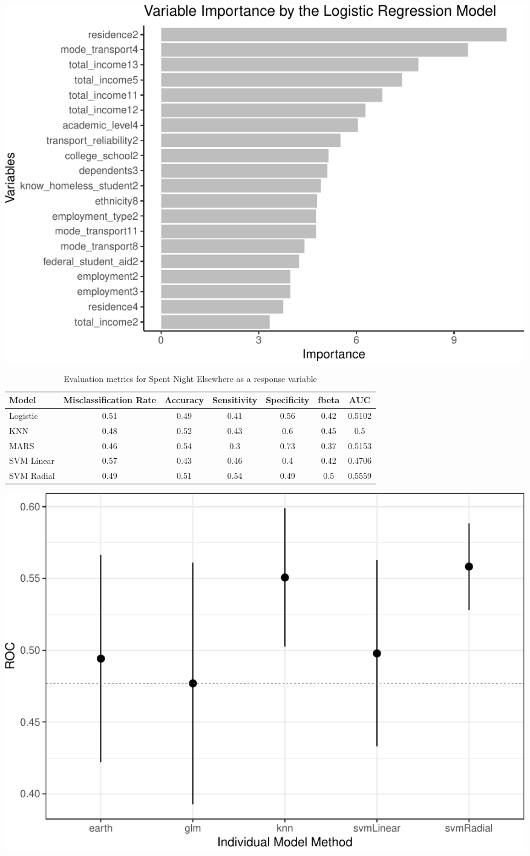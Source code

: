 \documentclass[
  10pt,
]{article}
\begin{document}
\includegraphics{phase2_report_files/figure-latex/unnamed-chunk-10-1}

\begin{table}[H]

\caption{\label{tab:unnamed-chunk-11}Evaluation metrics for Spent Night Elsewhere  as a response variable}
\centering
\fontsize{12}{14}\selectfont
\begin{tabular}[t]{lcccccc}
\toprule
Model & Misclassification Rate & Accuracy & Sensitivity & Specificity & fbeta & AUC\\
\midrule
Logistic & 0.51 & 0.49 & 0.41 & 0.56 & 0.42 & 0.5102\\
KNN & 0.48 & 0.52 & 0.43 & 0.6 & 0.45 & 0.5\\
MARS & 0.46 & 0.54 & 0.3 & 0.73 & 0.37 & 0.5153\\
SVM Linear & 0.57 & 0.43 & 0.46 & 0.4 & 0.42 & 0.4706\\
SVM Radial & 0.49 & 0.51 & 0.54 & 0.49 & 0.5 & 0.5559\\
\bottomrule
\end{tabular}
\end{table}

\includegraphics{phase2_report_files/figure-latex/unnamed-chunk-11-1}
\end{document}

